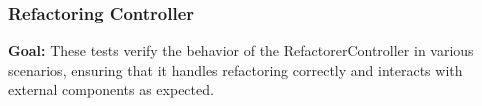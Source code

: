 \documentclass[12pt, titlepage]{article}
\begin{document}
		


					
					
					
					
					

					
					
					
					





  

\subsubsection{Refactoring Controller}

\textbf{Goal:} These tests verify the behavior of the RefactorerController in various scenarios, ensuring that it handles refactoring correctly and interacts with external components as expected.
\end{document}
